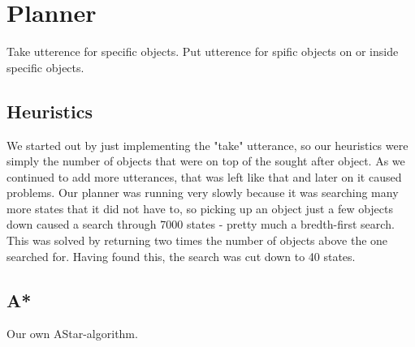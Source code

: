 \section*{Planner}
Take utterence for specific objects.
Put utterence for spific objects on or inside specific objects.

\subsection*{Heuristics}
We started out by just implementing the "take" utterance, so our heuristics
were simply the number of objects that were on top of the sought after object.
As we continued to add more utterances, that was left like that and later on it
caused problems. Our planner was running very slowly because it was searching
many more states that it did not have to, so picking up an object just a few
objects down caused a search through 7000 states - pretty much a bredth-first
search. This was solved by returning two times the number of objects above the
one searched for. Having found this, the search was cut down to 40 states.

\subsection*{A*}
Our own AStar-algorithm.


